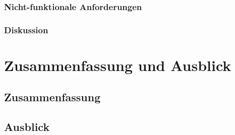 \documentclass[a4paper, fontsize=11pt]{scrartcl}
\begin{document}
\subsubsection{Nicht-funktionale Anforderungen}\label{subsubsec:non-functional-requirements}
\subsubsection{Diskussion}\label{subsubsec:anforderungsanalyse-discussion}

\section{Zusammenfassung und Ausblick}\label{sec:summary}
\subsection{Zusammenfassung}\label{subsec:summary}
\subsection{Ausblick}\label{subsec:outlook}

\newpage

\printbibliography{}
\listoffigures
\end{document}
